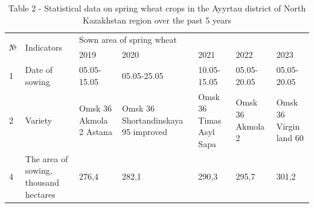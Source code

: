 \begin{table}[H]
\caption*{Table 2 - Statistical data on spring wheat crops in the Ayyrtau district of North Kazakhstan region over the past 5 years}
\centering
\begin{tabular}{|l|p{}|llllp{}|}
\hline
\multirow{2}{*}{№} & \multirow{2}{*}{Indicators}           & \multicolumn{5}{l|}{Sown area of spring wheat}                                                                                                                                                                                                                                                                                                                                                                                                              \\ \cline{3-7}
                   &                                       & \multicolumn{1}{l|}{2019}                                                                    & \multicolumn{1}{l|}{2020}                                                                            & \multicolumn{1}{l|}{2021}                                                                    & \multicolumn{1}{l|}{2022}                                                         & 2023                                                               \\ \hline
1                  & Date of sowing                        & \multicolumn{1}{l|}{05.05-15.05}                                                             & \multicolumn{1}{l|}{05.05-25.05}                                                                     & \multicolumn{1}{l|}{10.05-15.05}                                                             & \multicolumn{1}{l|}{05.05-20.05}                                                  & 05.05-20.05                                                        \\ \hline
2                  & Variety                               & \multicolumn{1}{p{0.1\textwidth}|}{Omsk 36 Akmola 2 Astana} & \multicolumn{1}{p{0.15\textwidth}|}{Omsk 36 Shortandinskaya 95 improved} & \multicolumn{1}{p{0.1\textwidth}|}{Omsk 36 Timas Asyl Sapa} & \multicolumn{1}{p{0.1\textwidth}|}{Omsk 36 Akmola 2} & Omsk 36 Virgin land 60 \\ \hline
4                  & The area of sowing, thousand hectares & \multicolumn{1}{l|}{276,4}                                                                   & \multicolumn{1}{l|}{282,1}                                                                           & \multicolumn{1}{l|}{290,3}                                                                   & \multicolumn{1}{l|}{295,7}                                                        & 301,2                                                              \\ \hline
\end{tabular}%
\end{table}

